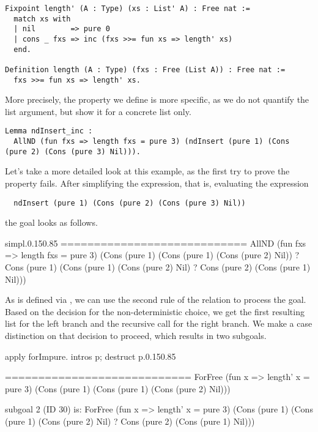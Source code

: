 \begin{verbatim}
Fixpoint length' (A : Type) (xs : List' A) : Free nat :=
  match xs with
  | nil        => pure 0
  | cons _ fxs => inc (fxs >>= fun xs => length' xs)
  end.

Definition length (A : Type) (fxs : Free (List A)) : Free nat :=
  fxs >>= fun xs => length' xs.
\end{verbatim}
  
More precisely, the property we define is more specific, as we do not quantify the list argument, but show it for a concrete list only.

\begin{verbatim}
Lemma ndInsert_inc :
  AllND (fun fxs => length fxs = pure 3) (ndInsert (pure 1) (Cons (pure 2) (Cons (pure 3) Nil))).
\end{verbatim}

Let's take a more detailed look at this example, as the first try to prove the property fails.
After simplifying the expression, that is, evaluating the expression
\begin{verbatim}
  ndInsert (pure 1) (Cons (pure 2) (Cons (pure 3) Nil))
\end{verbatim}
the goal looks as follows.

\begin{cproof1}{simpl.}{0.15}{0.85}
  ============================
  AllND (fun fxs => length fxs = pure 3)
        (Cons (pure 1) (Cons (pure 1) (Cons (pure 2) Nil))
        ? Cons (pure 1) (Cons (pure 1) (Cons (pure 2) Nil)
        ? Cons (pure 2) (Cons (pure 1) Nil)))
\end{cproof1}

As  is defined via , we can use the second rule of the relation to process the goal.
Based on the decision for the non-deterministic choice, we get the first resulting list for the left branch and the recursive call for the right branch.
We make a case distinction on that decision to proceed, which results in two subgoals.

\begin{cproof1}{apply forImpure. intros p; destruct p.}{0.15}{0.85}

  ============================
  ForFree (fun x => length' x = pure 3)
          (Cons (pure 1) (Cons (pure 1) (Cons (pure 2) Nil)))

subgoal 2 (ID 30) is:
  ForFree (fun x => length' x = pure 3)
          (Cons (pure 1) (Cons (pure 1) (Cons (pure 2) Nil)
          ? Cons (pure 2) (Cons (pure 1) Nil)))
\end{cproof1}

